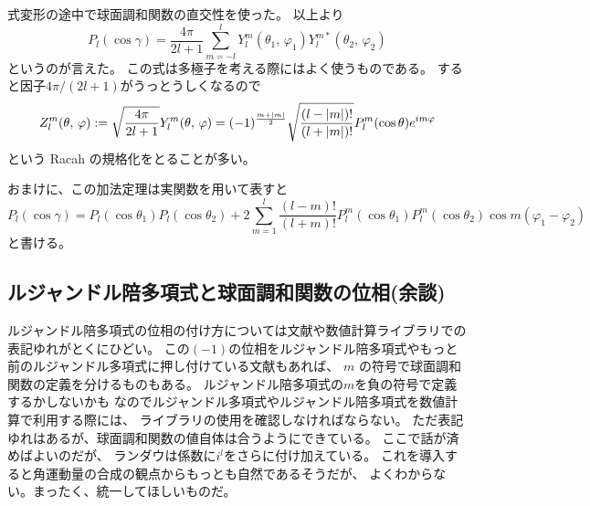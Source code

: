 \documentclass[../../master.tex]{subfiles}
\begin{document}
式変形の途中で球面調和関数の直交性を使った。
以上より
\begin{equation}
	P_l(\cos\gamma) = \frac{4\pi}{2l+1}\sum_{m=-l}^{l} Y_l^m(\theta_1,\,\varphi_1) Y_l^{m*}(\theta_2,\,\varphi_2)
\end{equation}
というのが言えた。
この式は多極子を考える際にはよく使うものである。
すると因子\(4\pi/(2l+1)\)がうっとうしくなるので
\begin{equation}
	Z_l^m(\theta,\,\varphi) := \sqrt{\frac{4\pi}{2l+1}} Y_l^m(\theta,\,\varphi)
	= (-1)^{\frac{m+\abs{m}}{2}}\sqrt{\frac{(l-\abs{m})!}{(l+\abs{m})!}}P_l^m(\cos\theta)e^{im\varphi}
\end{equation}
という Racah の規格化をとることが多い。

おまけに、この加法定理は実関数を用いて表すと
\begin{equation}
	P_l(\cos\gamma) = P_l(\cos\theta_1)P_l(\cos\theta_2)
	+ 2\sum_{m=1}^{l}\frac{(l-m)!}{(l+m)!}P_l^m(\cos\theta_1)P_l^m(\cos\theta_2)\cos m(\varphi_1-\varphi_2)
\end{equation}
と書ける。

\subsection{ルジャンドル陪多項式と球面調和関数の位相(余談)}

ルジャンドル陪多項式の位相の付け方については文献や数値計算ライブラリでの表記ゆれがとくにひどい。
この\((-1)\)の位相をルジャンドル陪多項式やもっと前のルジャンドル多項式に押し付けている文献もあれば、
\(m\) の符号で球面調和関数の定義を分けるものもある。
ルジャンドル陪多項式の\(m\)を負の符号で定義するかしないかも
なのでルジャンドル多項式やルジャンドル陪多項式を数値計算で利用する際には、
ライブラリの使用を確認しなければならない。
ただ表記ゆれはあるが、球面調和関数の値自体は合うようにできている。
ここで話が済めばよいのだが、
ランダウは係数に\(i^l\)をさらに付け加えている。
これを導入すると角運動量の合成の観点からもっとも自然であるそうだが、
よくわからない。まったく、統一してほしいものだ。


\end{document}
